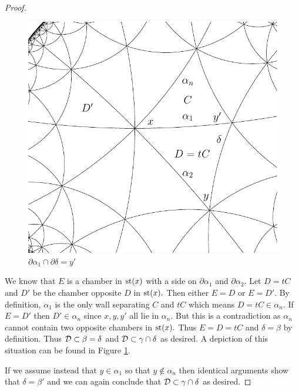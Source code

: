 \documentclass[class=book, crop=false,12 pt]{standalone}
\begin{document}
\begin{proof}
	\begin{figure}[h]
	\begin{center}
	\includegraphics[width=3.5 in]{diagrams/containD.pdf}
\end{center}
\caption{$\partial\alpha_1\cap \partial\delta=y'$}
	\label{fig:localpic}
\end{figure}

	We know that $E$ is a chamber in $\mathrm{st}(x)$ with a side on $\partial \alpha_1$ and $\partial\alpha_2.$ Let $D=tC$ and $D'$ be the chamber opposite $D$ in $\mathrm{st}(x).$ Then either $E=D$ or $E=D'.$ By definition, $\alpha_1$ is the only wall separating $C$ and $tC$ which means $D=tC\in \alpha_n.$ If $E=D'$ then $D'\in \alpha_n$ since $x,y,y'$ all lie in $\alpha_n.$ But this is a contradiction as $\alpha_n$ cannot contain two opposite chambers in $\mathrm{st}(x).$ Thus $E=D=tC$ and $\delta=\beta$ by definition. Thus $\mathcal{D}\subset \beta=\delta$ and $\mathcal{D}\subset \gamma\cap \delta$ as desired. A depiction of this situation can be found in Figure \ref{fig:localpic}.

	If we assume instead that $y\in\alpha_1$ so that $y\not\in \alpha_n$ then identical arguments show that $\delta=\beta'$ and we can again conclude that $\mathcal{D}\subset \gamma\cap \delta$ as desired.


\end{proof}
\end{document}
